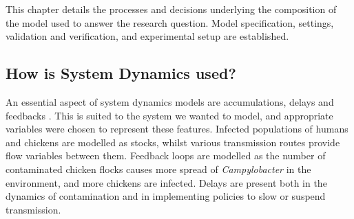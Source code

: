 
This chapter details the processes and decisions underlying the composition of the model used to answer the research question. Model specification, settings, validation and verification, and experimental setup are established.

\subsection{How is System Dynamics used?}

An essential aspect of system dynamics models are accumulations, delays and feedbacks \parencite{sterman_system_2001}. This is suited to the system we wanted to model, and appropriate variables were chosen to represent these features. Infected populations of humans and chickens are modelled as stocks, whilst various transmission routes provide flow variables between them. Feedback loops are modelled as the number of contaminated chicken flocks causes more spread of \textit{Campylobacter} in the environment, and more chickens are infected. Delays are present both in the dynamics of contamination and in implementing policies to slow or suspend transmission.


